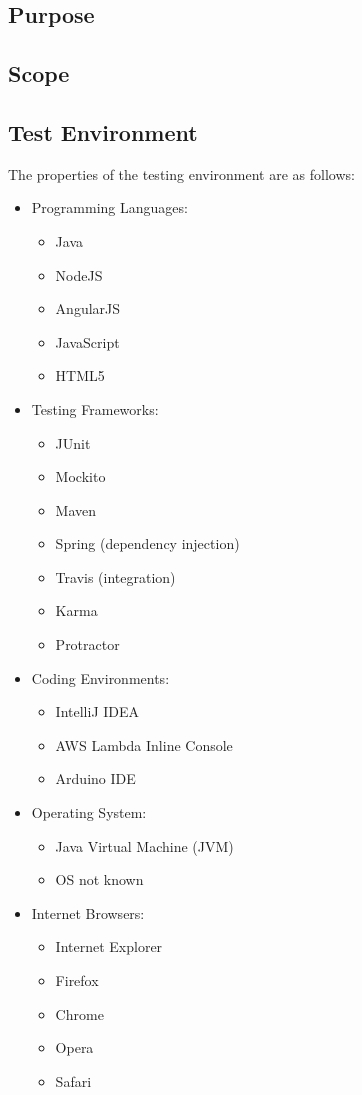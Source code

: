 \documentclass{article}
\begin{document}
	\subsection{Purpose}
	
	\subsection{Scope}
		
	\subsection{Test Environment}
	
		The properties of the testing environment are as follows:
		\begin{itemize}
			\item Programming Languages:
				\begin{itemize}
					\item Java
					\item NodeJS
					\item AngularJS
					\item JavaScript
					\item HTML5
				\end{itemize}
			\item Testing Frameworks:
				\begin{itemize}
					\item JUnit
					\item Mockito
					\item Maven
					\item Spring (dependency injection)
					\item Travis (integration)
					\item Karma
					\item Protractor
				\end{itemize}
			\item Coding Environments:
				\begin{itemize}
					\item IntelliJ IDEA
					\item AWS Lambda Inline Console
					\item Arduino IDE
				\end{itemize}
			\item Operating System:
				\begin{itemize}
					\item Java Virtual Machine (JVM)
					\item OS not known
				\end{itemize}
			\item Internet Browsers:
				\begin{itemize}
					\item Internet Explorer
					\item Firefox
					\item Chrome
					\item Opera
					\item Safari
				\end{itemize}
		\end{itemize}
	
\end{document}
